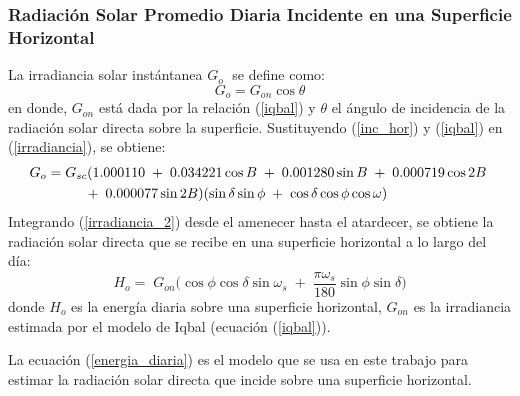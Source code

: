 \documentclass{beamer}
\begin{document}
\begin{frame}
   \frametitle{Radiación Solar Promedio Diaria Incidente en una Superficie Horizontal}
   \scriptsize La irradiancia solar instántanea $G_o \;$ se define como:
   \begin{equation}
     \label{irradiancia}
      G_o = G_{on} \cos\theta
   \end{equation}
   en donde, $G_{on}$ está dada por la relación (\ref{iqbal}) y $\theta$ el ángulo de incidencia de la radiación solar directa sobre la superficie.
   Sustituyendo (\ref{inc_hor}) y (\ref{iqbal}) en (\ref{irradiancia}), se obtiene:
   \begin{align}
      \notag
      \label{irradiancia_2}
      G_o = & \; G_{sc} (1.000110 \; + \; 0.034221 \cos B \; + \; 0.001280\sin B \; + \; 0.000719 \cos 2B \; \\
            & \; \; \; \; \; \; + \; 0.000077 \sin 2B)(\sin\delta\sin\phi \; + \; \cos\delta\cos\phi\cos\omega)
   \end{align}
   Integrando (\ref{irradiancia_2}) desde el amenecer hasta el atardecer, se obtiene la radiación solar directa que se recibe en una superficie horizontal a lo
   largo del día:
   \begin{equation} \label{energia_diaria} H_o = \; G_{on} \big(\cos\phi\cos\delta\sin\omega_s \; + \; \frac{\pi\omega_s}{180}\sin\phi\sin\delta \big) \end{equation}
   donde $H_o$ es la energía diaria sobre una superficie horizontal, $G_{on}$ es la irradiancia estimada por el modelo de Iqbal (ecuación (\ref{iqbal})).\par

   La ecuación (\ref{energia_diaria}) es el modelo que se usa en este trabajo para estimar la radiación solar directa que incide sobre una superficie horizontal.
\end{frame}

\end{document}
